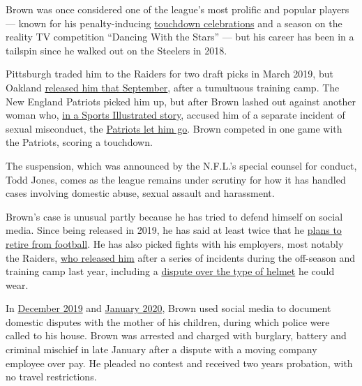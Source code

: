 Brown was once considered one of the league's most prolific and popular
players --- known for his penalty-inducing
\href{https://www.nytimes3xbfgragh.onion/2017/05/23/sports/football/nfl-rules-changes-celebrations-overtime.html}{touchdown
celebrations} and a season on the reality TV competition ``Dancing With
the Stars'' --- but his career has been in a tailspin since he walked
out on the Steelers in 2018.

Pittsburgh traded him to the Raiders for two draft picks in March 2019,
but Oakland
\href{https://www.nytimes3xbfgragh.onion/2019/09/07/sports/football/antonio-brown-raiders-released.html?module=inline}{released
him that September}, after a tumultuous training camp. The New England
Patriots picked him up, but after Brown lashed out against another woman
who,
\href{https://www.si.com/nfl/2019/09/16/antonio-brown-new-england-patriots-lawsuits-accusations-sexual-midconduct-assault}{in
a Sports Illustrated story}, accused him of a separate incident of
sexual misconduct, the
\href{https://www.nytimes3xbfgragh.onion/2019/09/20/sports/antonio-brown-patriots-texts.html?module=inline}{Patriots
let him go}. Brown competed in one game with the Patriots, scoring a
touchdown.

The suspension, which was announced by the N.F.L.'s special counsel for
conduct, Todd Jones, comes as the league remains under scrutiny for how
it has handled cases involving domestic abuse, sexual assault and
harassment.

Brown's case is unusual partly because he has tried to defend himself on
social media. Since being released in 2019, he has said at least twice
that he
\href{https://www.nytimes3xbfgragh.onion/2019/09/22/sports/antonio-brown-retire-nfl.html}{plans
to retire from football}. He has also picked fights with his employers,
most notably the Raiders,
\href{https://www.nytimes3xbfgragh.onion/2019/09/07/sports/football/antonio-brown-raiders-released.html}{who
released him} after a series of incidents during the off-season and
training camp last year, including a
\href{https://twitter.com/RapSheet/status/1165670451332489216}{dispute
over the type of helmet} he could wear.

In
\href{https://www.tmz.com/2019/12/14/antonio-brown-cops-surround-florida-house-kid-clothes-baby-mama/}{December
2019} and
\href{https://www.tmz.com/2020/01/13/antonio-brown-police-hollywood-florida-chelsie-kyriss/}{January
2020}, Brown used social media to document domestic disputes with the
mother of his children, during which police were called to his house.
Brown was arrested and charged with burglary, battery and criminal
mischief in late January after a dispute with a moving company employee
over pay. He pleaded no contest and received two years probation, with
no travel restrictions.

